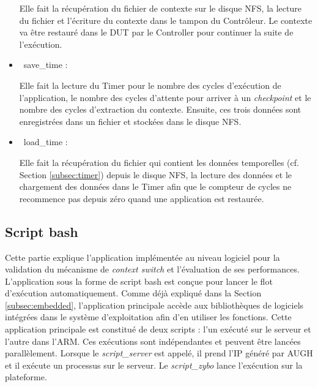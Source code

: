 \begin{itemize}
	Elle fait la récupération du fichier de contexte sur le disque NFS, la lecture du fichier et l'écriture du contexte
	dans le tampon du Contrôleur.
	Le contexte va être restauré dans le DUT par le Controller pour continuer la suite de l'exécution.
	
	\item\
	save\_time :
	
	Elle fait la lecture du Timer pour le nombre des cycles d'exécution de l'application, le nombre des cycles d'attente pour arriver à un \emph{checkpoint}
	et le nombre des cycles d'extraction du contexte. Ensuite, ces trois données sont enregistrées dans un
	fichier et stockées dans le disque NFS.
	
	\item\
	load\_time :
	
	Elle fait la récupération du fichier qui contient les données temporelles (cf. Section \ref{subsec:timer}) depuis le disque NFS, la lecture des données et le chargement des
	données dans le Timer afin que le compteur de cycles ne recommence pas depuis zéro quand une application
	est restaurée.

\end{itemize}

\subsection{Script bash} %
Cette partie explique l'application implémentée au niveau logiciel pour la validation du
mécanisme de \emph{context switch} et l'évaluation de ses performances.
L'application sous la forme de script bash est conçue pour lancer le flot d'exécution automatiquement. 
Comme déjà expliqué dans la Section \ref{subsec:embedded}, l'application principale accède aux
bibliothèques de logiciels intégrées dans le système d'exploitation afin d'en utiliser les fonctions.
Cette application principale est constitué de deux scripts : l'un exécuté sur le serveur et l'autre
dans l'ARM. Ces exécutions sont indépendantes et peuvent être
lancées parallèlement. Lorsque le \emph{script\_server} est appelé, il prend
l'IP généré par AUGH et il exécute un processus sur le serveur. Le \emph{script\_zybo}
lance l'exécution sur la plateforme.

